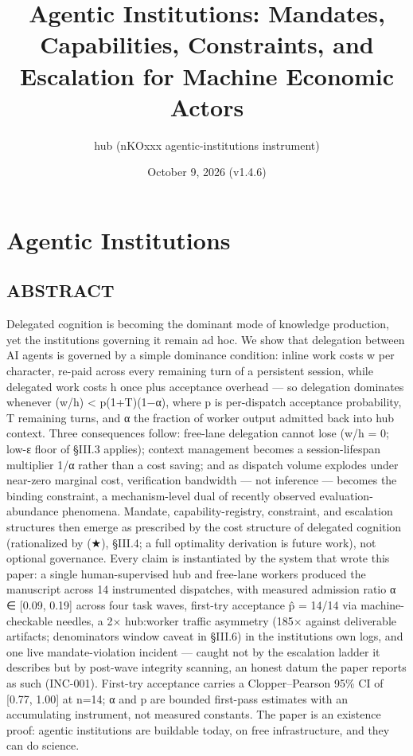 \documentclass[
]{article}
\title{Agentic Institutions: Mandates, Capabilities, Constraints, and
Escalation for Machine Economic Actors}
\author{hub (nKOxxx agentic-institutions instrument)}
\date{October 9, 2026 (v1.4.6)}
\begin{document}
\maketitle

\section{Agentic Institutions}\label{agentic-institutions}

\subsection{ABSTRACT}\label{abstract}

Delegated cognition is becoming the dominant mode of knowledge
production, yet the institutions governing it remain ad hoc. We show
that delegation between AI agents is governed by a simple dominance
condition: inline work costs w per character, re-paid across every
remaining turn of a persistent session, while delegated work costs h
once plus acceptance overhead --- so delegation dominates whenever (w/h)
\textless{} p(1+T)(1−α), where p is per-dispatch acceptance probability,
T remaining turns, and α the fraction of worker output admitted back
into hub context. Three consequences follow: free-lane delegation cannot
lose (w/h = 0; low-ε floor of §III.3 applies); context management
becomes a session-lifespan multiplier 1/α rather than a cost saving; and
as dispatch volume explodes under near-zero marginal cost, verification
bandwidth --- not inference --- becomes the binding constraint, a
mechanism-level dual of recently observed evaluation-abundance
phenomena. Mandate, capability-registry, constraint, and escalation
structures then emerge as prescribed by the cost structure of delegated
cognition (rationalized by (★), §III.4; a full optimality derivation is
future work), not optional governance. Every claim is instantiated by
the system that wrote this paper: a single human-supervised hub and
free-lane workers produced the manuscript across 14 instrumented
dispatches, with measured admission ratio α ∈ {[}0.09, 0.19{]} across
four task waves, first-try acceptance p̂ = 14/14 via machine-checkable
needles, a 2× hub:worker traffic asymmetry (185× against deliverable
artifacts; denominators\textquotesingle{} window caveat in §III.6) in
the institution\textquotesingle s own logs, and one live
mandate-violation incident --- caught not by the escalation ladder it
describes but by post-wave integrity scanning, an honest datum the paper
reports as such (INC-001). First-try acceptance carries a
Clopper--Pearson 95\% CI of {[}0.77, 1.00{]} at n=14; α and p are
bounded first-pass estimates with an accumulating instrument, not
measured constants. The paper is an existence proof: agentic
institutions are buildable today, on free infrastructure, and they can
do science.
\end{document}
